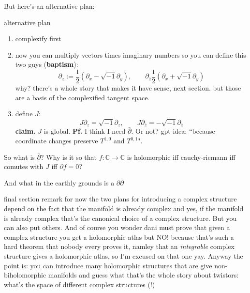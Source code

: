 But here's an alternative plan:
\begin{thing6}{alternative plan}\leavevmode
\begin{enumerate}[label=\textbf{Step \arabic*}]
\item complexify first
\item now you can multiply vectors times imaginary numbers so you can define this two guys (\textbf{baptism}):
	\[\partial_z:=\frac{1}{2}(\partial_x-\sqrt{-1}\partial_y),\qquad \partial_{\bar{z}}\frac{1}{2}(\partial_x+\sqrt{-1}\partial_y)\]
	why? there's a whole story that makes it have sense, next section. but those are a basis of the complexified tangent space.
\item define \(J\):
	\[J\partial_z=\sqrt{-1}\partial_z,\qquad J\partial_{\overline{z}}=-\sqrt{-1}\partial_{\overline{z}}\]
\textbf{claim.} \(J\) is global. \textbf{Pf.} I think I need \(\bar\partial\). Or not? gpt-idea: ``because coordinate changes preserve \(T^{1,0}\) and \(T^{0,1}\)".
\end{enumerate}
\end{thing6}

So what is \(\overline{\partial}\)? Why is it so that \(f:\mathbb{C} \to \mathbb{C}\) is holomorphic iff cauchy-riemann iff comutes with \(J\) iff \(\overline{\partial}f=0\)?

And what in the earthly grounds is a \(\partial\bar\partial\)

\begin{thing6}{final section remark for now}\leavevmode
the two plans for introducing a complex structure depend on the fact that the manifold is already complex and yes, if the manifold is already complex that's the canonical choice of a complex structure. But you can also put others. And of course you wonder dani must prove that given a complex structure you get a holomorphic atlas but NO! because that's such a hard theorem that nobody every proves it, namley that an \textit{integrable} complex structure gives a holomorphic atlas, so I'm excused on that one yay. Anyway the point is: you can introduce many holomorphic structures that are give non-biholomorphic manifolds and guess what that's the whole story about twistors: what's the space of different complex structures (!)
\end{thing6}

